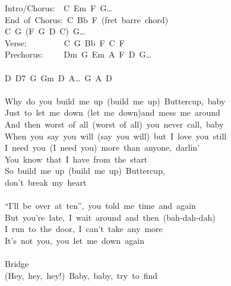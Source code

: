 \documentclass[]{book}
\begin{document}
Intro/Chorus:~~C~Em~F~G\ldots{}\\
End~of~Chorus:~C~Bb~F~(fret~barre~chord)~\\
\hspace*{0.333em}\hspace*{0.333em}\hspace*{0.333em}\hspace*{0.333em}\hspace*{0.333em}\hspace*{0.333em}\hspace*{0.333em}\hspace*{0.333em}\hspace*{0.333em}\hspace*{0.333em}\hspace*{0.333em}\hspace*{0.333em}\hspace*{0.333em}\hspace*{0.333em}\hspace*{0.333em}C~G~(F~G~D~C)~G\ldots{}\\
Verse:~~~~~~~~~C~G~Bb~F~C~F\\
Prechorus:~~~~~Dm~G~Em~A~F~D~G\ldots{}\\
~\\
D~D7~G~Gm~D~A\ldots~G~A~D\\
~\\
Why~do~you~build~me~up~(build~me~up)~Buttercup,~baby\\
Just~to~let~me~down~(let~me~down)and~mess~me~around\\
And~then~worst~of~all~(worst~of~all)~you~never~call,~baby\\
When~you~say~you~will~(say~you~will)~but~I~love~you~still\\
I~need~you~(I~need~you)~more~than~anyone,~darlin'\\
You~know~that~I~have~from~the~start\\
So~build~me~up~(build~me~up)~Buttercup,~\\
don't~break~my~heart\\
~\\
``I'll~be~over~at~ten'',~you~told~me~time~and~again\\
But~you're~late,~I~wait~around~and~then~(bah-dah-dah)\\
I~run~to~the~door,~I~can't~take~any~more\\
It's~not~you,~you~let~me~down~again\\
~\\
Bridge\\
(Hey,~hey,~hey!)~Baby,~baby,~try~to~find\\
\end{document}
